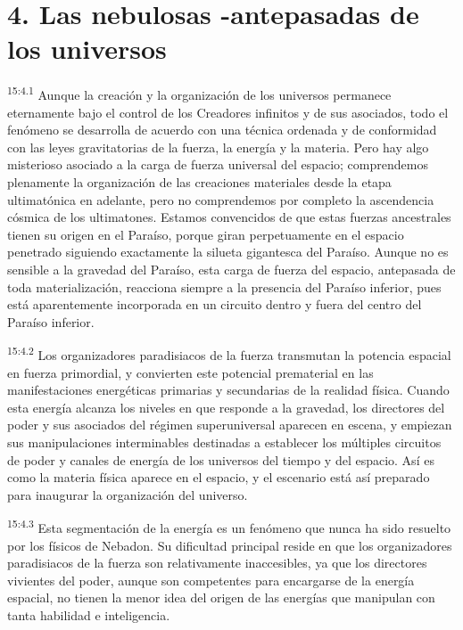 \section*{4. Las nebulosas -antepasadas de los universos}
\par
\textsuperscript{15:4.1} Aunque la creación y la organización de los universos permanece eternamente bajo el control de los Creadores infinitos y de sus asociados, todo el fenómeno se desarrolla de acuerdo con una técnica ordenada y de conformidad con las leyes gravitatorias de la fuerza, la energía y la materia. Pero hay algo misterioso asociado a la carga de fuerza universal del espacio; comprendemos plenamente la organización de las creaciones materiales desde la etapa ultimatónica en adelante, pero no comprendemos por completo la ascendencia cósmica de los ultimatones. Estamos convencidos de que estas fuerzas ancestrales tienen su origen en el Paraíso, porque giran perpetuamente en el espacio penetrado siguiendo exactamente la silueta gigantesca del Paraíso. Aunque no es sensible a la gravedad del Paraíso, esta carga de fuerza del espacio, antepasada de toda materialización, reacciona siempre a la presencia del Paraíso inferior, pues está aparentemente incorporada en un circuito dentro y fuera del centro del Paraíso inferior.

\par
\textsuperscript{15:4.2} Los organizadores paradisiacos de la fuerza transmutan la potencia espacial en fuerza primordial, y convierten este potencial prematerial en las manifestaciones energéticas primarias y secundarias de la realidad física. Cuando esta energía alcanza los niveles en que responde a la gravedad, los directores del poder y sus asociados del régimen superuniversal aparecen en escena, y empiezan sus manipulaciones interminables destinadas a establecer los múltiples circuitos de poder y canales de energía de los universos del tiempo y del espacio. Así es como la materia física aparece en el espacio, y el escenario está así preparado para inaugurar la organización del universo.

\par
\textsuperscript{15:4.3} Esta segmentación de la energía es un fenómeno que nunca ha sido resuelto por los físicos de Nebadon. Su dificultad principal reside en que los organizadores paradisiacos de la fuerza son relativamente inaccesibles, ya que los directores vivientes del poder, aunque son competentes para encargarse de la energía espacial, no tienen la menor idea del origen de las energías que manipulan con tanta habilidad e inteligencia.

